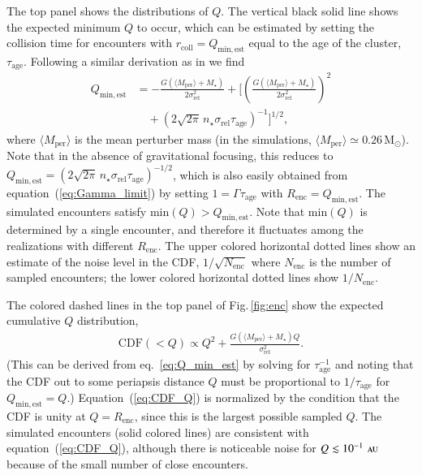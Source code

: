 \documentclass[iop,usenatbib]{emulateapj}
\newcommand{\F}{Fig.}
\newcommand{\msun}{\mathrm{M}_\odot}
\newcommand{\au}{\,\textsc{au}}
\newcommand{\renc}{R_\mathrm{enc}}
\newcommand{\mper}{M_\mathrm{per}}
\newcommand{\srel}{\sigma_\mathrm{rel}}
\begin{document}
The top panel shows the distributions of $Q$. The vertical black solid line shows the expected minimum $Q$ to occur, which can be estimated by setting the collision time for encounters with $r_\mathrm{coll} = Q_\mathrm{min,est}$ equal to the age of the cluster, $\tau_\mathrm{age}$. Following a similar derivation as in \citet[S7.5.8]{2008gady.book.....B} we find
\begin{align}
\label{eq:Q_min_est}
\nonumber Q_\mathrm{min,est} &= -\frac{G( \langle \mper \rangle + M_\star)}{2\srel^2} + \biggl [ \left (\frac{G( \langle \mper \rangle + M_\star)}{2\srel^2} \right )^2 \\
&\quad + \left ( 2 \sqrt{2\pi} \, n_\star \srel \tau_\mathrm{age} \right )^{-1} \biggl ]^{1/2},
\end{align}
where $\langle \mper \rangle$ is the mean perturber mass (in the simulations, $\langle \mper \rangle \simeq 0.26\, \msun$). Note that in the absence of gravitational focusing, this reduces to $Q_\mathrm{min,est} = \left ( 2 \sqrt{2\pi} \, n_\star \srel \tau_\mathrm{age} \right )^{-1/2}$, which is also easily obtained from equation~(\ref{eq:Gamma_limit}) by setting $1 = \Gamma \tau_\mathrm{age}$ with $\renc = Q_\mathrm{min,est}$. The simulated encounters satisfy $\mathrm{min}(Q) > Q_\mathrm{min,est}$. Note that $\mathrm{min}(Q)$ is determined by a single encounter, and therefore it fluctuates among the realizations with different $\renc$. The upper colored horizontal dotted lines show an estimate of the noise level in the CDF, $1/\sqrt{N_\mathrm{enc}}$ where $N_\mathrm{enc}$ is the number of sampled encounters; the lower colored horizontal dotted lines show $1/N_\mathrm{enc}$.

The colored dashed lines in the top panel of \F\,\ref{fig:enc} show the expected cumulative $Q$ distribution, 
\begin{align}
\label{eq:CDF_Q}
\mathrm{CDF}(<Q) \propto Q^2 + \frac{G( \langle \mper \rangle + M_\star) Q }{\srel^2}.
\end{align}
(This can be derived from eq.~\ref{eq:Q_min_est} by solving for $\tau_\mathrm{age}^{-1}$ and noting that the CDF out to some periapsis distance $Q$ must be proportional to $1/\tau_\mathrm{age}$ for $Q_\mathrm{min,est}=Q$.) Equation~(\ref{eq:CDF_Q}) is normalized by the condition that the CDF is unity at $Q=\renc$, since this is the largest possible sampled $Q$. The simulated encounters (solid colored lines) are consistent with equation~(\ref{eq:CDF_Q}), although there is noticeable noise for $Q\lesssim 10^{-1} \, \au$ because of the small number of close encounters. 
\end{document}
